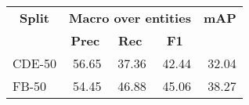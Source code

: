 \begin{tabular}{| l | r | r | r | r |}
    \hline

    \multicolumn{1}{|c|}{\textbf{Split}} &
    \multicolumn{3}{|c|}{\textbf{Macro over entities}} &
    \multicolumn{1}{|c|}{\textbf{mAP}} \\

    \multicolumn{1}{|c|}{} &
    \multicolumn{1}{|c|}{\textbf{Prec}} &
    \multicolumn{1}{|c|}{\textbf{Rec}} &
    \multicolumn{1}{|c|}{\textbf{F1}} &
    \multicolumn{1}{|c|}{} \\

    \hline \hline

    CDE-50 & 56.65 & 37.36 & 42.44 & 32.04 \\
    FB-50  & 54.45 & 46.88 & 45.06 & 38.27 \\

    \hline
\end{tabular}
